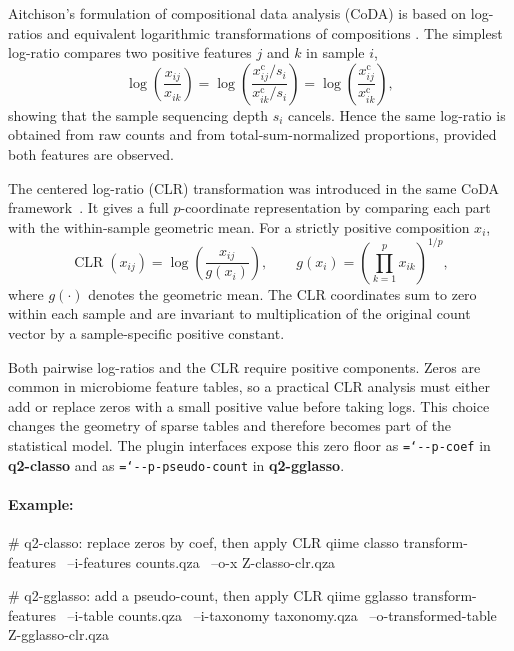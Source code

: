 \documentclass[11pt,a4paper]{article}
\newcommand{\code}[1]{\allowbreak\texttt{\hyphenchar\font=`\-\relax #1}}
\newcommand{\pkg}[1]{\textbf{#1}}
\newcommand{\CLR}{\operatorname{CLR}}
\begin{document}
Aitchison's formulation of compositional data analysis (CoDA) is based on
log-ratios and equivalent logarithmic transformations of compositions
\citep{aitchison1982statistical}. The simplest log-ratio compares two positive
features $j$ and $k$ in sample $i$,
\begin{equation}
\label{eq:logratio-invariance}
\log\left(\frac{x_{ij}}{x_{ik}}\right)
=
\log\left(\frac{x^{\mathrm{c}}_{ij}/s_i}{x^{\mathrm{c}}_{ik}/s_i}\right)
=
\log\left(\frac{x^{\mathrm{c}}_{ij}}{x^{\mathrm{c}}_{ik}}\right),
\end{equation}
showing that the sample sequencing depth $s_i$ cancels. Hence the same log-ratio is obtained
from raw counts and from total-sum-normalized proportions, provided both features
are observed.

The centered log-ratio (CLR) transformation was introduced in the same CoDA
framework~\citep{aitchison1982statistical}. It gives a full $p$-coordinate
representation by comparing each part with the within-sample geometric mean. For
a strictly positive composition $x_i$,
\begin{equation}
\label{eq:clr}
\CLR(x_{ij}) = \log\left(\frac{x_{ij}}{g(x_i)}\right),
\qquad
g(x_i)=\left(\prod_{k=1}^{p} x_{ik}\right)^{1/p},
\end{equation}
where $g(\cdot)$ denotes the geometric mean. The CLR coordinates sum to zero
within each sample and are invariant to multiplication of the original count
vector by a sample-specific positive constant.

Both pairwise log-ratios and the CLR require positive components.
Zeros are common in microbiome feature tables, so a practical CLR analysis must
either add or replace zeros with a small positive value before taking logs. This
choice changes the geometry of sparse tables and therefore becomes part of the
statistical model. The plugin interfaces expose this zero floor
as \code{-{}-p-coef} in \pkg{q2-classo} and as
\code{-{}-p-pseudo-count} in \pkg{q2-gglasso}.

\paragraph{Example:} \mbox{}
\begin{PseudoCode}
# q2-classo: replace zeros by coef, then apply CLR
qiime classo transform-features \
    --i-features counts.qza \
    --o-x Z-classo-clr.qza

# q2-gglasso: add a pseudo-count, then apply CLR
qiime gglasso transform-features \
    --i-table counts.qza \
    --i-taxonomy taxonomy.qza \
    --o-transformed-table Z-gglasso-clr.qza
\end{PseudoCode}
\end{document}
